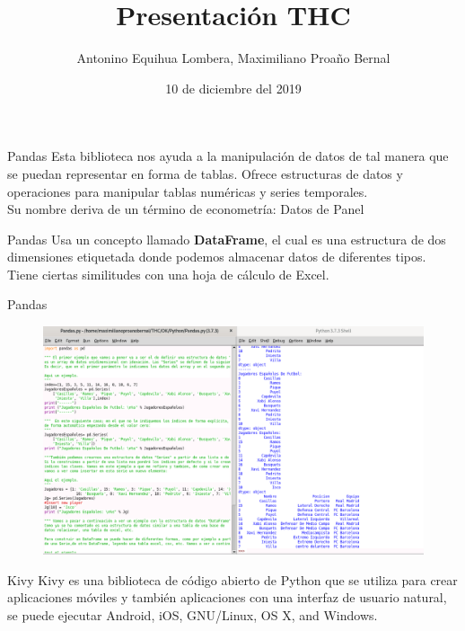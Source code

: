 \documentclass{beamer}
\title{Presentación THC}
\author{Antonino Equihua Lombera, Maximiliano Proaño Bernal}
\date{10 de diciembre del 2019}
\institute{Facultad de Ciencias, UNAM}
\begin{document}
\begin{frame}[plain]
    \maketitle
\end{frame}
\begin{frame}{Pandas}
	Esta biblioteca nos ayuda a la manipulación de datos de tal manera que se puedan representar en forma de tablas. Ofrece estructuras de datos y operaciones para manipular tablas numéricas y series temporales.\\
	Su nombre deriva de un término de econometría: Datos de Panel
\end{frame}

\begin{frame}{Pandas}
	Usa un concepto llamado \textbf{DataFrame}, el cual es una estructura de dos dimensiones etiquetada donde podemos almacenar datos de diferentes tipos. Tiene ciertas similitudes con una hoja de cálculo de Excel.
\end{frame}

\begin{frame}{Pandas}
	\begin{figure}
		\centering
		\includegraphics[width=1.0\linewidth]{"../Python/Captura Pandas"}
		\caption{}
		\label{fig:captura-pandas}
	\end{figure}
	
\end{frame}

\begin{frame}{Kivy}
	Kivy es una biblioteca de código abierto de Python que se utiliza para crear aplicaciones móviles y también aplicaciones con una interfaz de usuario natural, se puede ejecutar Android, iOS, GNU/Linux, OS X, and Windows.
\end{frame}
\end{document}

